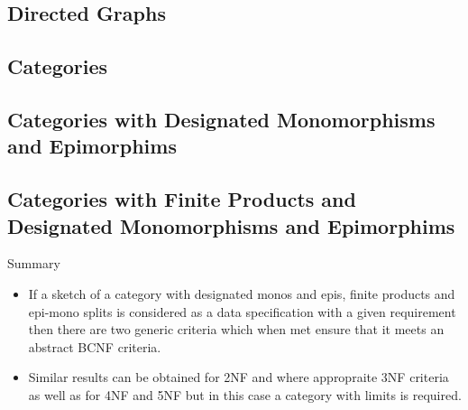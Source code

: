 \subsection{Directed Graphs}


\subsection{Categories}


\subsection{Categories with Designated Monomorphisms and Epimorphims}


\subsection{Categories with Finite Products and Designated Monomorphisms and Epimorphims}


\begin{frame}{Summary}
\begin{itemize}
\item If a sketch of a category with designated monos and epis, finite products and epi-mono splits is
 considered as a data specification with a given requirement then there are  two generic criteria which when met
 ensure that it meets an abstract BCNF criteria.
\item Similar results can be obtained for 2NF and where appropraite 3NF criteria as well as for 4NF and 5NF but in this case a category with limits is required.
\end{itemize}
\end{frame}
\fi


\iffalse

\subsection{Entity-Relationship Notation}


\subsection{Unused}

\fi

